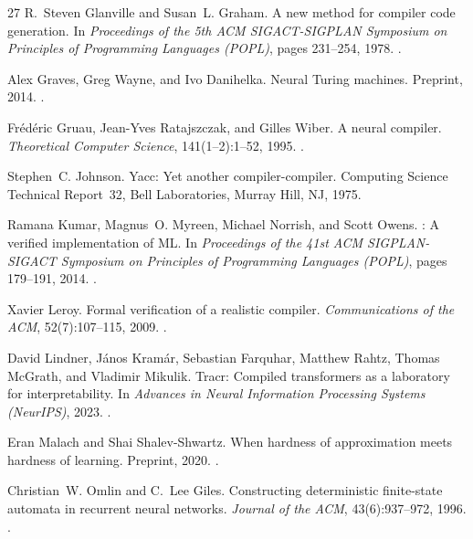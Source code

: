 \documentclass[11pt]{article}
\begin{document}
\begin{thebibliography}{27}
R.~Steven Glanville and Susan~L. Graham.
\newblock A new method for compiler code generation.
\newblock In \emph{Proceedings of the 5th ACM SIGACT-SIGPLAN Symposium on Principles of Programming Languages (POPL)}, pages 231--254, 1978.
\newblock {}.

Alex Graves, Greg Wayne, and Ivo Danihelka.
\newblock Neural {Turing} machines.
\newblock Preprint, 2014.
\newblock {}.

Fr{\'e}d{\'e}ric Gruau, Jean-Yves Ratajszczak, and Gilles Wiber.
\newblock A neural compiler.
\newblock \emph{Theoretical Computer Science}, 141(1--2):1--52, 1995.
\newblock {}.

Stephen~C. Johnson.
\newblock Yacc: Yet another compiler-compiler.
\newblock Computing Science Technical Report~32, Bell Laboratories, Murray Hill, NJ, 1975.

Ramana Kumar, Magnus~O. Myreen, Michael Norrish, and Scott Owens.
: A verified implementation of {ML}.
\newblock In \emph{Proceedings of the 41st ACM SIGPLAN-SIGACT Symposium on Principles of Programming Languages (POPL)}, pages 179--191, 2014.
\newblock {}.

Xavier Leroy.
\newblock Formal verification of a realistic compiler.
\newblock \emph{Communications of the ACM}, 52(7):107--115, 2009.
\newblock {}.

David Lindner, J{\'a}nos Kram{\'a}r, Sebastian Farquhar, Matthew Rahtz, Thomas McGrath, and Vladimir Mikulik.
\newblock Tracr: Compiled transformers as a laboratory for interpretability.
\newblock In \emph{Advances in Neural Information Processing Systems (NeurIPS)}, 2023.
\newblock {}.

Eran Malach and Shai Shalev-Shwartz.
\newblock When hardness of approximation meets hardness of learning.
\newblock Preprint, 2020.
\newblock {}.

Christian~W. Omlin and C.~Lee Giles.
\newblock Constructing deterministic finite-state automata in recurrent neural networks.
\newblock \emph{Journal of the ACM}, 43(6):937--972, 1996.
\newblock {}.


\end{thebibliography}
\end{document}
